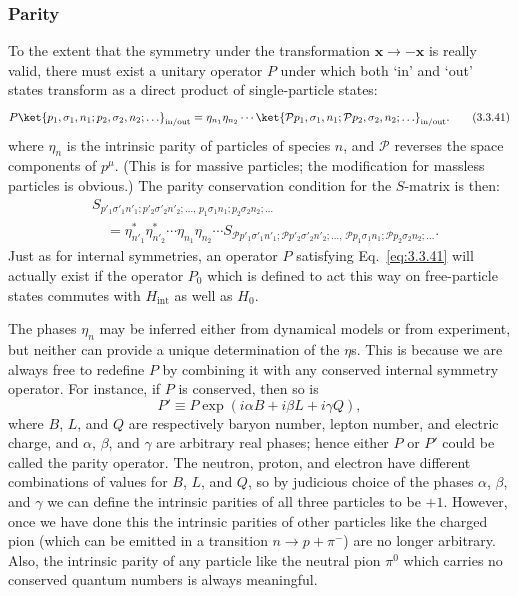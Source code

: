 \subsubsection*{Parity}

To the extent that the symmetry under the transformation $\mathbf{x}\to-\mathbf{x}$
is really valid, there must exist a unitary operator $P$ under which both `in' and
`out' states transform as a direct product of single-particle states:
\begin{equation}
P\ket{p_1,\sigma_1,n_1;p_2,\sigma_2,n_2;\ldots}_{\mathrm{in/out}}
=\eta_{n_1}\eta_{n_2}\cdots
\ket{\mathcal{P}p_1,\sigma_1,n_1;\mathcal{P}p_2,\sigma_2,n_2;\ldots}_{\mathrm{in/out}}.
\tag{3.3.41}\label{eq:3.3.41}
\end{equation}
where $\eta_n$ is the intrinsic parity of particles of species $n$, and $\mathcal{P}$
reverses the space components of $p^\mu$. (This is for massive particles; the
modification for massless particles is obvious.) The parity conservation condition
for the $S$-matrix is then:
\begin{align}
&S_{p'_1\sigma'_1n'_1;p'_2\sigma'_2n'_2;\ldots,\,
p_1\sigma_1n_1;p_2\sigma_2n_2;\ldots}
\nonumber\\
&\quad=\eta^*_{n'_1}\eta^*_{n'_2}\cdots\eta_{n_1}\eta_{n_2}\cdots
S_{\mathcal{P}p'_1\sigma'_1n'_1;\mathcal{P}p'_2\sigma'_2n'_2;\ldots,\,
\mathcal{P}p_1\sigma_1n_1;\mathcal{P}p_2\sigma_2n_2;\ldots}.
\tag{3.3.42}\label{eq:3.3.42}
\end{align}
Just as for internal symmetries, an operator $P$ satisfying Eq.~\eqref{eq:3.3.41} will
actually exist if the operator $P_0$ which is defined to act this way on
free-particle states commutes with $H_{\mathrm{int}}$ as well as $H_0$.

The phases $\eta_n$ may be inferred either from dynamical models or from experiment,
but neither can provide a unique determination of the $\eta$s. This is because we are
always free to redefine $P$ by combining it with any conserved internal symmetry
operator. For instance, if $P$ is conserved, then so is
\[
P'\equiv P\exp(i\alpha B+i\beta L+i\gamma Q),
\]
where $B$, $L$, and $Q$ are respectively baryon number, lepton number, and electric
charge, and $\alpha$, $\beta$, and $\gamma$ are arbitrary real phases; hence either
$P$ or $P'$ could be called the parity operator. The neutron, proton, and electron
have different combinations of values for $B$, $L$, and $Q$, so by judicious choice
of the phases $\alpha$, $\beta$, and $\gamma$ we can define the intrinsic parities of
all three particles to be $+1$. However, once we have done this the intrinsic parities
of other particles like the charged pion (which can be emitted in a transition
$n\to p+\pi^-$) are no longer arbitrary. Also, the intrinsic parity of any particle
like the neutral pion $\pi^0$ which carries no conserved quantum numbers is always
meaningful.

